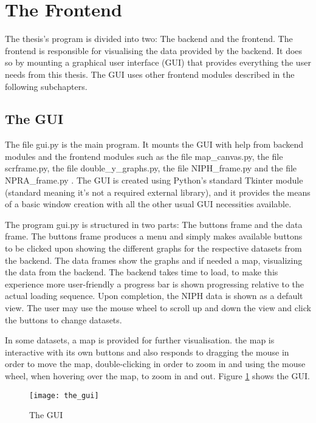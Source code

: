 \newpage










\section{The Frontend}
The thesis's program is divided into two: The backend and the frontend. The frontend is responsible for visualising the data provided by the backend. It does so by mounting a graphical user interface (GUI) that provides everything the user needs from this thesis. The GUI uses other frontend modules described in the following subchapters.

\subsection{The GUI}
The file gui.py is the main program. It mounts the GUI with help from backend modules and the frontend modules such as the file map\_canvas.py, the file scrframe.py, the file double\_y\_graphs.py, the file NIPH\_frame.py and the file NPRA\_frame.py . The GUI is created using Python's standard Tkinter module (standard meaning it's not a required external library), and it provides the means of a basic window creation with all the other usual GUI necessities available. 

The program gui.py is structured in two parts: The buttons frame and the data frame. The buttons frame produces a menu and simply makes available buttons to be clicked upon showing the different graphs for the respective datasets from the backend. The data frames show the graphs and if needed a map, visualizing the data from the backend. The backend takes time to load, to make this experience more user-friendly a progress bar is shown progressing relative to the actual loading sequence. Upon completion, the NIPH data is shown as a default view. The user may use the mouse wheel to scroll up and down the view and click the buttons to change datasets. 

In some datasets, a map is provided for further visualisation. the map is interactive with its own buttons and also responds to dragging the mouse in order to move the map, double-clicking in order to zoom in and using the mouse wheel, when hovering over the map, to zoom in and out. Figure \ref{fig:the_gui} shows the GUI.

\begin{figure}[!htb]
\texttt{[image: the\_gui]}
\centering
\caption{The GUI}
\label{fig:the_gui}
\end{figure}



